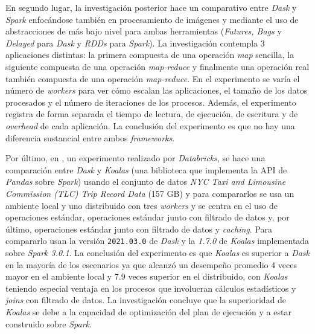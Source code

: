 En segundo lugar, la investigación posterior \cite{dask-spark-neuroimaging} hace un comparativo entre \textit{Dask} y \textit{Spark} enfocándose también en procesamiento de imágenes y mediante el uso de abstracciones de más bajo nivel para ambas herramientas (\textit{Futures, Bags} y \textit{Delayed} para \textit{Dask} y \textit{RDDs} para \textit{Spark}). La investigación contempla 3 aplicaciones distintas: la primera compuesta de una operación \textit{map} sencilla, la siguiente compuesta de una operación \textit{map-reduce} y finalmente una operación real también compuesta de una operación \textit{map-reduce}. En el experimento se varía el número de \textit{workers} para ver cómo escalan las aplicaciones, el tamaño de los datos procesados y el número de iteraciones de los procesos. Además, el experimento registra de forma separada el tiempo de lectura, de ejecución, de escritura y de \textit{overhead} de cada aplicación. La conclusión del experimento es que no hay una diferencia sustancial entre ambos \textit{frameworks}.

Por último, en \cite{koalas-dask}, un experimento realizado por \textit{Databricks}, se hace una comparación entre \textit{Dask} y \textit{Koalas} (una biblioteca que implementa la API de \textit{Pandas} sobre \textit{Spark}) usando el conjunto de datos \textit{NYC Taxi and Limousine Commission (TLC) Trip Record Data} (157 GB) y para compararlos se usa un ambiente local y uno distribuido con tres \textit{workers} y se centra en el uso de operaciones estándar, operaciones estándar junto con filtrado de datos y, por último, operaciones estándar junto con filtrado de datos y \textit{caching}. Para compararlo usan la versión \texttt{2021.03.0} de \textit{Dask} y la \textit{1.7.0} de \textit{Koalas} implementada sobre \textit{Spark 3.0.1}. La conclusión del experimento es que \textit{Koalas} es superior a \textit{Dask} en la mayoría de los escenarios ya que alcanzó un desempeño promedio 4 veces mayor en el ambiente local y 7.9 veces superior en el distribuido, con \textit{Koalas} teniendo especial ventaja en los procesos que involucran cálculos estadísticos y \textit{joins} con filtrado de datos. La investigación concluye que la superioridad de \textit{Koalas} se debe a la capacidad de optimización del plan de ejecución y a estar construido sobre \textit{Spark}.

\newpage

